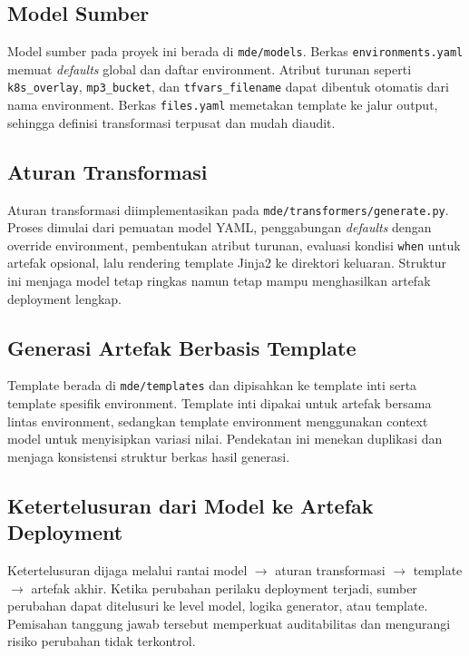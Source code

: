 \subsection{Model Sumber}\label{subsec:mde-model-sumber}

Model sumber pada proyek ini berada di \texttt{mde/models}. Berkas \texttt{environments.yaml} memuat \textit{defaults} global dan daftar environment. Atribut turunan seperti \texttt{k8s\_overlay}, \texttt{mp3\_bucket}, dan \texttt{tfvars\_filename} dapat dibentuk otomatis dari nama environment. Berkas \texttt{files.yaml} memetakan template ke jalur output, sehingga definisi transformasi terpusat dan mudah diaudit.

\subsection{Aturan Transformasi}\label{subsec:mde-aturan-transformasi}

Aturan transformasi diimplementasikan pada \texttt{mde/transformers/generate.py}. Proses dimulai dari pemuatan model YAML, penggabungan \textit{defaults} dengan override environment, pembentukan atribut turunan, evaluasi kondisi \texttt{when} untuk artefak opsional, lalu rendering template Jinja2 ke direktori keluaran. Struktur ini menjaga model tetap ringkas namun tetap mampu menghasilkan artefak deployment lengkap.

\subsection[Generasi Artefak Berbasis Templatesubsec]{Generasi Artefak Berbasis Template}\label{subsec:mde-template}

Template berada di \texttt{mde/templates} dan dipisahkan ke template inti serta template spesifik environment. Template inti dipakai untuk artefak bersama lintas environment, sedangkan template environment menggunakan context model untuk menyisipkan variasi nilai. Pendekatan ini menekan duplikasi dan menjaga konsistensi struktur berkas hasil generasi.

\subsection[Ketertelusuran dari Model ke Artefak]{Ketertelusuran dari Model ke Artefak Deployment}\label{subsec:mde-traceability}

Ketertelusuran dijaga melalui rantai model $\rightarrow$ aturan transformasi $\rightarrow$ template $\rightarrow$ artefak akhir. Ketika perubahan perilaku deployment terjadi, sumber perubahan dapat ditelusuri ke level model, logika generator, atau template. Pemisahan tanggung jawab tersebut memperkuat auditabilitas dan mengurangi risiko perubahan tidak terkontrol.

